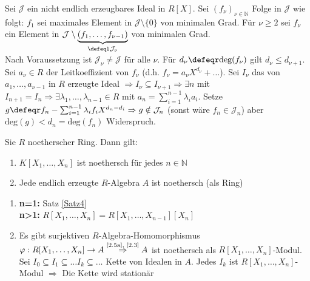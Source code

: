 \begin{Bew} 
  Sei $\mathcal{J}$ ein nicht endlich erzeugbares Ideal in $R[X]$.
  Sei $(f_{\nu})_{\nu \in \mathbb{N}}$ Folge in $\mathcal{J}$ wie folgt:
  $f_1$ sei maximales Element in $\mathcal{J} \setminus \{0\}$ von minimalen
  Grad. Für $\nu \ge 2$ sei $f_{\nu}$ ein Element in $\mathcal{J} \setminus
  \underset{\defeql \mathcal{J}_{\nu}}{\underbrace{(f_1, \dots , f_{\nu - 1})}}$
  von minimalen Grad.\\
  Nach Voraussetzung ist $\mathcal{J}_{\nu} \not= \mathcal{J}$ für alle $\nu$.
  Für $d_{\nu} \defeqr \mbox{deg}(f_{\nu})$ gilt $d_{\nu} \le d_{\nu + 1}$.
  Sei $a_{\nu} \in R$ der Leitkoeffizient von $f_{\nu}$ (d.h. $f_{\nu} =
  a_{\nu} X^{d_{\nu}} + \dots$). Sei $I_{\nu}$ das von $a_1, \dots , a_{\nu -1}$
  in $R$ erzeugte Ideal $\Rightarrow I_{\nu} \subseteq I_{\nu + 1} \Rightarrow
  \exists n$ mit $I_{n+1} = I_n \Rightarrow \exists \lambda_1, \dots ,
  \lambda_{n-1} \in R$ mit $a_n = \sum_{i=1}^{n-1} \lambda_i a_i$.
  Setze $g \defeqr f_n - \sum_{i=1}^{n-1} \lambda_i f_i X^{d_n - d_i}
  \Rightarrow g \notin \mathcal{J}_n$ (sonst wäre $f_n \in \mathcal{J}_n$) aber
  $\mbox{deg}(g) < d_n = \mbox{deg}(f_n)$ Widerspruch.
\end{Bew}

\begin{Folg} 
  Sie $R$ noetherscher Ring. Dann gilt:
  \begin{enumerate}
    \item \label{2.5a} $K[X_1, \dots , X_n]$ ist noethersch für jedes $n \in
    \mathbb{N}$
    \item Jede endlich erzeugte $R$-Algebra $A$ ist noethersch (als Ring)
  \end{enumerate}
\end{Folg}

\begin{Bew} 
  \begin{enumerate} 
    \item \textbf{n=1:} Satz \ref{Satz4}\\
          \textbf{n>1:} $R[X_1, \dots , X_n] = R[X_1, \dots , X_{n-1}][X_n]$
    \item Es gibt surjektiven $R$-Algebra-Homomorphismus $\varphi: R[X_1, \dots
          , X_n] \to A \overset{\mbox{\scriptsize \ref{2.5a},
          \ref{2.3}}}{\Rightarrow} A$ ist noethersch als $R[X_1, \dots ,
          X_n]$-Modul. Sei $I_0 \subseteq I_1 \subseteq \dots I_k \subseteq
          \dots$ Kette von Idealen in $A$. Jedes $I_k$ ist $R[X_1, \dots ,
          X_n]$-Modul $\Rightarrow$ Die Kette wird stationär
\end{enumerate}
\end{Bew}
